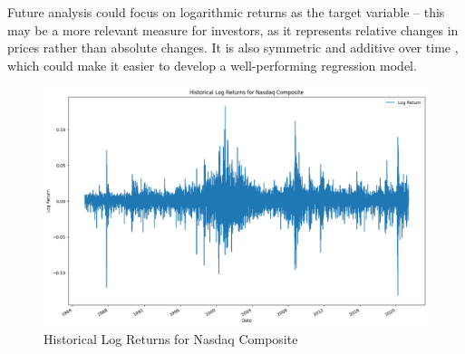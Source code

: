 \documentclass[a4paper, 11pt]{article}
\begin{document}
Future analysis could focus on logarithmic returns as the target variable -- this may be a more relevant measure for investors, as it represents relative changes in prices rather than absolute changes. It is also symmetric and additive over time \cite{whyLogReturns}, which could make it easier to develop a well-performing regression model.

\begin{figure}[H]
    \begin{center}
        \includegraphics[width=1\textwidth]{Historical Log Returns for Nasdaq Composite.png}
        \caption{Historical Log Returns for Nasdaq Composite}
    \end{center}
\end{figure}



\end{document}
